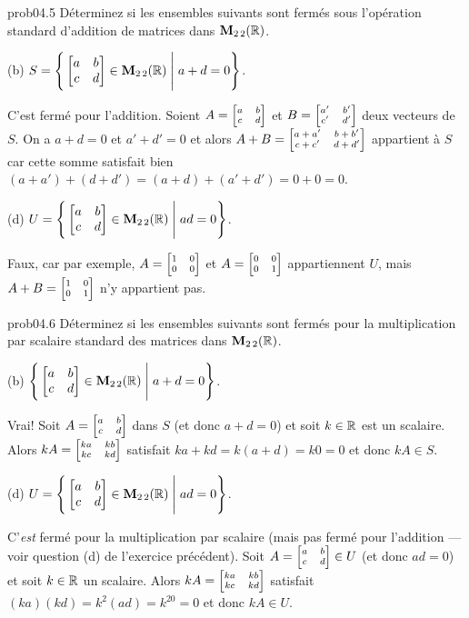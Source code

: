 \bigskip
\begin{sol}{prob04.5}  Déterminez si les
ensembles suivants sont fermés sous l'opération standard d'addition de
matrices dans $\mathbf{M}_{2 \,2}(\mathbb{R})$.

\medskip
(b)
$S=\Bigg\{  \bmatrix a&b \\c&d\endbmatrix \in \M_{2 \,2}(\R) \;\Bigg|\; a+d=0\Bigg\}$.

\soln C'est fermé pour l'addition. Soient
$A=\scriptsize\bmatrix a&b\\ c&d\endbmatrix$ et
$B=\scriptsize\bmatrix a'&b'\\ c'&d'\endbmatrix$ deux vecteurs de $S$. On a 
$a+d=0$ et $a'+d'=0$ et alors
$A+B=\scriptsize\bmatrix a+a'&b+b'\\ c+c'&d+d'\endbmatrix$ appartient à $S$ car cette somme satisfait bien
$(a+a')+(d+d')= (a+d) +(a'+d')=0+0=0$.

\medskip
(d)
$U=\Bigg\{  \bmatrix a&b\\ c&d\endbmatrix \in \M_{2 \,2}(\R) \;\Bigg|\; ad=0\Bigg\}$.

\soln Faux, car par exemple,
$A=\scriptsize\bmatrix 1&0 \\0&0\endbmatrix$ et
$A=\scriptsize\bmatrix 0&0\\ 0&1\endbmatrix$ appartiennent $U$,
mais $A+B= \scriptsize\bmatrix 1&0\\ 0&1\endbmatrix$ n'y appartient pas.
\medskip
\end{sol}

\bigskip
\begin{sol}{prob04.6} Déterminez si les
ensembles suivants sont fermés pour la multiplication par scalaire standard
des matrices dans $\mathbf{M}_{2 \,2}(\mathbb{R})$.

\medskip
(b)
$\Bigg\{  \bmatrix a&b \\ c&d\endbmatrix \in \M_{2 \,2}(\R) \;\Bigg|\; a+d=0\Bigg\}$.

\soln Vrai! Soit 
$A=\scriptsize\bmatrix a&b\\ c&d\endbmatrix$ dans $S$ (et donc $a+d=0$) et soit $k\in\mathbb{R}$ est un scalaire. Alors
$kA =\scriptsize\bmatrix ka &kb \\ kc & kd \endbmatrix$ satisfait
$ka + kd = k(a+d)=k0=0$ et donc $kA \in S$.

\medskip
(d)
$U=\Bigg\{  \bmatrix a&b \\c&d\endbmatrix \in \M_{2 \,2}(\R) \;\Bigg|\; ad=0\Bigg\}$.

\soln C'{\emph{est}} fermé pour la multiplication par scalaire (mais pas fermé pour l'addition --- voir question (d) de l'exercice
précédent). Soit $A=\scriptsize\bmatrix a&b\\ c&d\endbmatrix\in U$ (et donc $a  d=0$) et soit $k\in\mathbb{R}$ un 
scalaire. Alors $kA =\scriptsize\bmatrix ka &kb \\ kc & kd \endbmatrix$ satisfait
$(ka)  (kd) = k^2(a d)=k^20=0$ et donc $kA \in U$.
\medskip
\end{sol}

